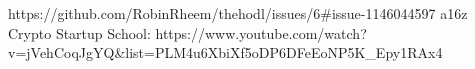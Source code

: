 \documentclass[11pt]{article}
\begin{document}
    https://github.com/RobinRheem/thehodl/issues/6#issue-1146044597
    a16z Crypto Startup School: https://www.youtube.com/watch?v=jVehCoqJgYQ&list=PLM4u6XbiXf5oDP6DFeEoNP5K_Epy1RAx4
\end{document}
